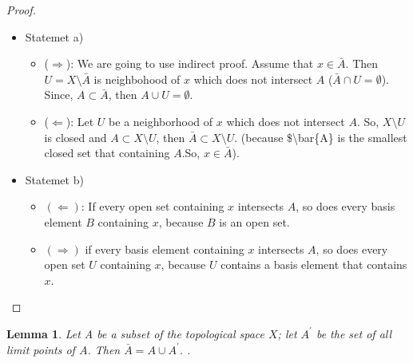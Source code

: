 \documentclass[
]{book}
\providecommand{\tightlist}{%
  \setlength{\itemsep}{0pt}\setlength{\parskip}{0pt}}
\newtheorem{lemma}{Lemma}[chapter]
\theoremstyle{definition}
\theoremstyle{definition}
\theoremstyle{definition}
\theoremstyle{definition}
\theoremstyle{remark}
\begin{document}
\begin{proof}
\leavevmode

\begin{itemize}
\tightlist
\item
  Statemet a)

  \begin{itemize}
  \tightlist
  \item
    (\(\Longrightarrow\)): We are going to use indirect proof. Assume that \(x\in \bar{A}\). Then \(U=X\setminus \bar{A}\) is neighbohood of \(x\) which does not intersect \(A\) (\(\bar{A} \cap U=\emptyset\)). Since, \(A\subset \bar{A}\), then \(A \cup U =\emptyset\).
  \item
    (\(\Longleftarrow\)):
    Let \(U\) be a neighborhood of \(x\) which does not intersect \(A\). So, \(X\setminus U\) is closed and \(A\subset X\setminus U\), then \(\bar{A}\subset X\setminus U\). (because \$\textbackslash bar\{A\} is the smallest closed set that containing \(A\).So, \(x\in \bar{A}\)).
  \end{itemize}
\item
  Statemet b)

  \begin{itemize}
  \item
    \((\Longleftarrow)\): If every open set containing \(x\) intersects \(A\), so does
    every basis element \(B\) containing \(x\), because \(B\) is an open set.
  \item
    \((\Longrightarrow)\) if every
    basis element containing \(x\) intersects \(A\), so does every open set \(U\) containing \(x\), because \(U\) contains a basis element that contains \(x\).
  \end{itemize}
\end{itemize}

\end{proof}

\begin{lemma}
\protect\hypertarget{lem:unnamed-chunk-69}{}\label{lem:unnamed-chunk-69}Let A be a subset of the topological space \(X\); let \(A^\prime\) be the set of all limit points of \(A\). Then \(\bar{A} = A \cup A^\prime\).
.
\end{lemma}
\end{document}

